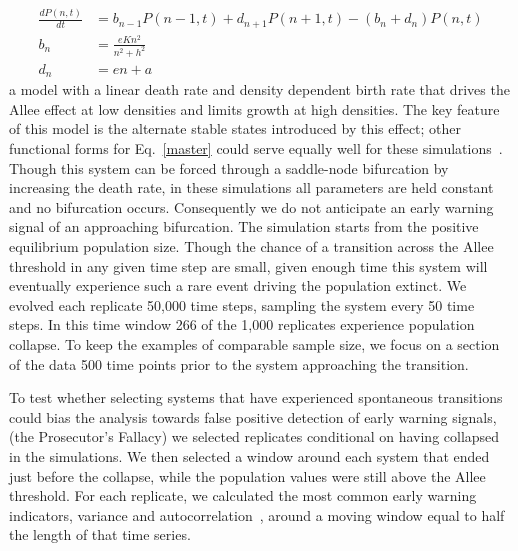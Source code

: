 \documentclass[authoryear,review,12pt]{elsarticle}
\begin{document}
\begin{align}
  \frac{dP(n,t)}{dt} &= b_{n-1} P(n-1,t) + d_{n+1}P(n+1,t) - (b_n+d_n) P(n,t)  \label{master} \\
    b_n &= \frac{e K n^2}{n^2 + h^2} \\
    d_n &= e n + a
\end{align}
a model with a linear death rate and density dependent birth rate
that drives the Allee effect at low densities and limits growth
at high densities.  The key feature of this model is the alternate
stable states introduced by this effect; other functional forms for
Eq.~\eqref{master} could serve equally well for these simulations~\citep[see
\emph{e.g.}][]{Scheffer2001}.  Though this system can be forced
through a saddle-node bifurcation by increasing the death rate, in
these simulations all parameters are held constant and no bifurcation
occurs.  Consequently we do not anticipate an early warning signal of
an approaching bifurcation.  The simulation starts from the positive
equilibrium population size.  Though the chance of a transition across
the Allee threshold in any given time step are small, given enough
time this system will eventually experience such a rare event driving
the population extinct.  We evolved each replicate 50,000 time steps,
sampling the system every 50 time steps.  In this time window 266 of the
1,000 replicates experience population collapse.  To keep the examples of
comparable sample size, we focus on a section of the data 500 time points
prior to the system approaching the transition.  

To test whether selecting systems that have experienced spontaneous transitions
could bias the analysis towards false positive detection of early warning signals,
(the Prosecutor's Fallacy) we selected replicates conditional on having collapsed
in the simulations.
We then selected a window around each system that ended just before the
collapse, while the population values were still above the Allee threshold.
For each replicate, we calculated the most common early warning indicators, variance
and autocorrelation~\citep[\emph{e.g.}][]{Carpenter2006,Dakos2008,Scheffer2009}, 
around a moving window equal to half the length of that time series.  
\end{document}
